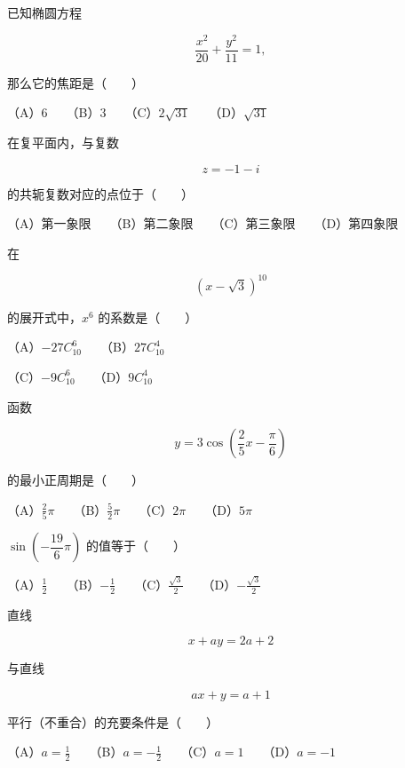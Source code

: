 \begin{question}
已知椭圆方程

\nopagebreak[4]
\[
\frac{x^2}{20}+\frac{y^2}{11}=1,
\]

那么它的焦距是\mbox{（　　）}

（A）$6$　　（B）$3$　　（C）$2\sqrt{31}$　　（D）$\sqrt{31}$

\end{question}
\begin{question}
在复平面内，与复数

\nopagebreak[4]
\[
z=-1-i
\]

的共轭复数对应的点位于\mbox{（　　）}

（A）第一象限　　（B）第二象限　　（C）第三象限　　（D）第四象限

\end{question}
\begin{question}
在

\nopagebreak[4]
\[
(x-\sqrt3)^{10}
\]

的展开式中，$x^6$ 的系数是\mbox{（　　）}

（A）$-27C_{10}^{6}$　　（B）$27C_{10}^{4}$

（C）$-9C_{10}^{6}$　　（D）$9C_{10}^{4}$

\end{question}
\begin{question}
函数

\nopagebreak[4]
\[
y=3\cos\left(\frac25x-\frac\pi6\right)
\]

的最小正周期是\mbox{（　　）}

（A）$\frac25\pi$　　（B）$\frac52\pi$　　（C）$2\pi$　　（D）$5\pi$

\end{question}
\begin{question}
$\sin\left(-\dfrac{19}{6}\pi\right)$ 的值等于\mbox{（　　）}

（A）$\frac12$　　（B）$-\frac12$　　（C）$\frac{\sqrt3}{2}$　　（D）$-\frac{\sqrt3}{2}$

\end{question}
\begin{question}
直线

\nopagebreak[4]
\[
x+ay=2a+2
\]

与直线

\nopagebreak[4]
\[
ax+y=a+1
\]

平行（不重合）的充要条件是\mbox{（　　）}

（A）$a=\frac12$　　（B）$a=-\frac12$　　（C）$a=1$　　（D）$a=-1$

\end{question}
